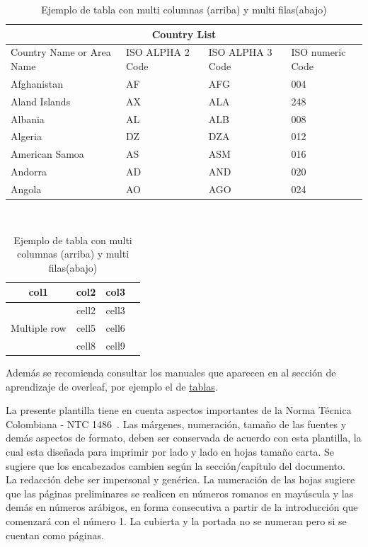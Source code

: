 \begin{table}[htbp!]
    \centering
    \caption{Ejemplo de tabla con multi columnas (arriba) y multi filas(abajo)}
    \begin{tabular}{ |p{3cm}||p{3cm}|p{3cm}|p{3cm}|  }
        \hline
        \multicolumn{4}{|c|}{Country List} \\
        \hline
        Country Name or Area Name& ISO ALPHA 2 Code &ISO ALPHA 3 Code&ISO numeric Code\\
        \hline
        Afghanistan   & AF    &AFG&   004\\
        Aland Islands&   AX  & ALA   &248\\
        Albania &AL & ALB&  008\\
        Algeria    &DZ & DZA&  012\\
        American Samoa&   AS  & ASM&016\\
        Andorra& AD  & AND   &020\\
        Angola& AO  & AGO&024\\
        \hline
    \end{tabular}\\
    \vspace{0.5cm}
    \begin{tabular}{ |c|c|c|c| } 
        \hline
        col1 & col2 & col3 \\
        \hline
        \multirow{3}{4em}{Multiple row} & cell2 & cell3 \\ 
        & cell5 & cell6 \\ 
        & cell8 & cell9 \\ 
        \hline
    \end{tabular}

    \label{tab:tablasEx}
\end{table}

Adem\'as se recomienda consultar los manuales que aparecen en al sección de aprendizaje de overleaf, por ejemplo el de \href{https://www.overleaf.com/learn/latex/Tables}{tablas}.

La presente plantilla tiene en cuenta aspectos importantes de la Norma T\'{e}cnica Colombiana - NTC 1486~\cite{NTC14862008}. Las márgenes, numeración, tamaño de las fuentes y demás aspectos de formato, deben ser conservada de acuerdo con esta plantilla, la cual esta diseñada para imprimir por lado y lado en hojas tamaño carta. Se sugiere que los encabezados cambien según la sección/capítulo del documento.\\

La redacción debe ser impersonal y genérica. La numeración de las hojas sugiere que las páginas preliminares se realicen en números romanos en mayúscula y las demás en números arábigos, en forma consecutiva a partir de la introducción que comenzará con el número 1. La cubierta y la portada no se numeran pero si se cuentan como páginas.\\

